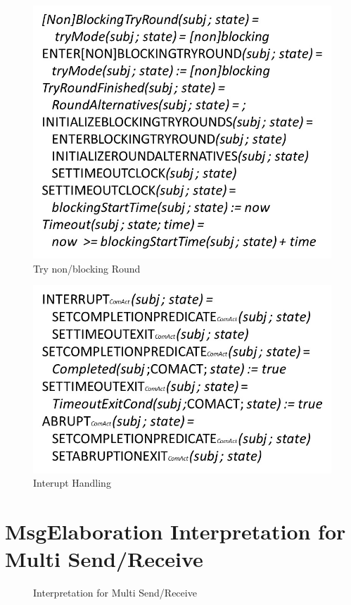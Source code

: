 \begin{figure}
	\centering
	\includegraphics[width=0.8\linewidth]{20181026-Ontologie-Bilder/Grafiken-Ontologie/SUbjectExecution/ASM-Try-Run}
	\caption[Try non/blocking Round]{Try non/blocking Round}
	\label{fig:asm-try-run}
\end{figure}
%
\begin{figure}[ph]
	\centering
	\includegraphics[width=0.8\linewidth]{20181026-Ontologie-Bilder/Grafiken-Ontologie/SUbjectExecution/ASM-Interrupt}
	\caption[Interupt Handling]{Interupt Handling}
	\label{fig:asm-interrupt}
\end{figure}

\newpage
\section{MsgElaboration Interpretation for Multi Send/Receive}

\begin{figure}[ph]
	\centering
	\caption[Interpretation for Multi Send/Receive]{Interpretation for Multi Send/Receive}
	\label{fig:asm-Message-Elaboration}
\end{figure}



